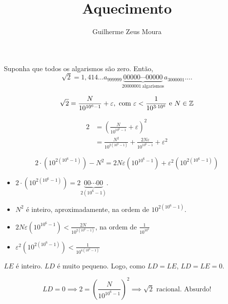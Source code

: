 \documentclass[10pt, a4paper]{article}
\title{Aquecimento}
\author{Guilherme Zeus Moura}
\begin{document}
	
	\zeustitle


	Suponha que todos os algarismos são zero. Então, \[\sqrt{2} = 1,414\dots a_{999999}\underbrace{00000\cdots00000}_{20000001\ \text{algarismos}} a_{3000001}\dots.\]

\[\sqrt{2} = \frac{N}{10^{10^6-1}} + \varepsilon,\ \text{com}\ \varepsilon < \frac{1}{10^{3\cdot10^6}}\ \text{e}\ N \in \ZZ \]

\begin{align*}
	2 &= \left( \frac{N}{10^{10^6-1}} + \varepsilon \right)^2\\
	  &= \frac{N^2}{10^{2(10^6 - 1)}} + \frac{2N\varepsilon}{10^{10^6 - 1}} + \varepsilon^2
\end{align*}

\[ 2\cdot(10^{2(10^6 - 1)}) - N^2 = 2N\varepsilon (10^{10^6-1}) + \varepsilon^2 (10^{2(10^6 - 1)})\]

\begin{itemize}
	\item $2\cdot(10^{2(10^6-1)}) = 2\underbrace{00\cdots00}_{2(10^6-1)}$.
	\item $N^2$ é inteiro, aproximadamente, na ordem de $10^{2(10^6-1)}$.
	\item $2N\varepsilon(10^{10^6 - 1}) < \frac{2N}{10^{2(10^6-1)}}$, na ordem de $\frac{1}{10^{10^6}}$
	\item $\varepsilon^2 (10^{2(10^6 - 1)}) < \frac{1}{10^{4(10^6 - 1)}}$
\end{itemize}

$LE$ é inteiro. $LD$ é muito pequeno. Logo, como $LD = LE$, $LD = LE = 0$.

\[LD = 0 \implies 2 = \left(\frac{N}{10^{10^6-1}}\right)^2 \implies \sqrt{2} \text{\ racional. Absurdo!}\]
\end{document}
